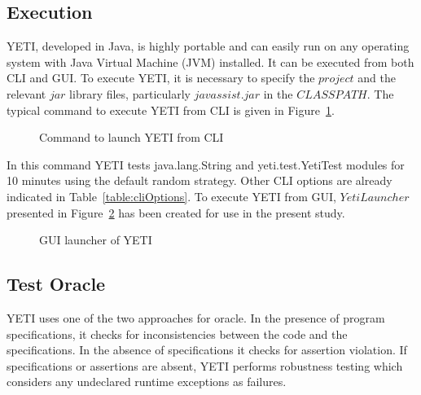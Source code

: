 \subsection{Execution}
YETI, developed in Java, is highly portable and can easily run on any operating system with Java Virtual Machine (JVM) installed. It can be executed from both CLI and GUI. To execute YETI, it is necessary to specify the $project$ and the relevant $jar$ library files, particularly $javassist.jar$ in the $CLASSPATH$. The typical command to execute YETI from CLI is given in Figure~\ref{fig:yeticommand}.
\smallskip
\begin{figure}[H]
	\centering
	\smallskip
	\caption{Command to launch YETI from CLI}
	\label{fig:yeticommand}
\end{figure}
\smallskip
In this command YETI tests java.lang.String and yeti.test.YetiTest modules for 10 minutes using the default random strategy. Other CLI options are already indicated in Table~\ref{table:cliOptions}. To execute YETI from GUI, $YetiLauncher$ presented in Figure~\ref{fig:yetiLauncher} has been created for use in the present study.
\bigskip
\begin{figure}[H]
	\centering
	\smallskip
	\caption{GUI launcher of YETI}
	\label{fig:yetiLauncher}
\end{figure}


\subsection{Test Oracle}
YETI uses one of the two approaches for oracle. In the presence of program specifications, it checks for inconsistencies between the code and the specifications. In the absence of specifications it checks for assertion violation.%
If specifications or assertions are absent, YETI performs robustness testing which considers any undeclared runtime exceptions as failures. 

